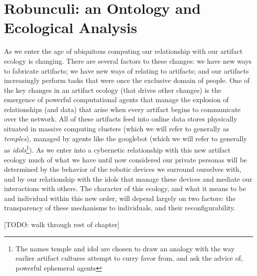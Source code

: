 \chapter{Robunculi: an Ontology and Ecological Analysis}
%
As we enter the age of ubiquitous computing \citep{weiser_1999} our relationship with our artifact ecology is changing. 
There are several factors to these changes: we have new ways to fabricate artifacts; we have new ways of relating to artifacts; and our artifacts increasingly perform tasks that were once the exclusive domain of people.
One of the key changes in an artifact ecology (that drives other changes) is the emergence of powerful computational agents that manage the explosion of relationships (and data) that arise when every artifact begins to communicate over the network.
All of these artifacts feed into online data stores physically situated in massive computing clusters (which we will refer to generally as \emph{temples}), managed by agents like the googlebot (which we will refer to generally as \emph{idols}\footnote{The names temple and idol are chosen to draw an analogy with the way earlier artifact cultures attempt to curry favor from, and ask the advice of, powerful ephemeral agents}).
As we enter into a cybernetic relationship with this new artifact ecology much of what we have until now considered our private personas will be determined by the behavior of the robotic devices we surround ourselves with, and by our relationship with the idols that manage these devices and mediate our interactions with others.
The character of this ecology, and what it means to be and individual within this new order, will depend largely on two factors: the transparency of these mechanisms to individuals, and their reconfigurability.

[TODO: walk through rest of chapter]

